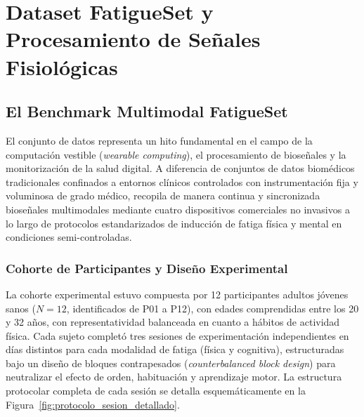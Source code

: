 
\chapter{Dataset FatigueSet y Procesamiento de Señales Fisiológicas}
\label{cap:dataset_preprocesamiento}

\section{El Benchmark Multimodal FatigueSet}
\label{sec:fatigueset_benchmark}

El conjunto de datos \fatigueset{} \cite{kalanadhabhatta2021fatigueset, kalanadhabhatta2022fatigueset} representa un hito fundamental en el campo de la computación vestible (\textit{wearable computing}), el procesamiento de bioseñales y la monitorización de la salud digital. A diferencia de conjuntos de datos biomédicos tradicionales confinados a entornos clínicos controlados con instrumentación fija y voluminosa de grado médico, \fatigueset{} recopila de manera continua y sincronizada bioseñales multimodales mediante cuatro dispositivos comerciales no invasivos a lo largo de protocolos estandarizados de inducción de fatiga física y mental en condiciones semi-controladas.

\subsection{Cohorte de Participantes y Diseño Experimental}

La cohorte experimental estuvo compuesta por 12 participantes adultos jóvenes sanos ($N=12$, identificados de P01 a P12), con edades comprendidas entre los 20 y 32 años, con representatividad balanceada en cuanto a hábitos de actividad física. Cada sujeto completó tres sesiones de experimentación independientes en días distintos para cada modalidad de fatiga (física y cognitiva), estructuradas bajo un diseño de bloques contrapesados (\textit{counterbalanced block design}) para neutralizar el efecto de orden, habituación y aprendizaje motor. La estructura protocolar completa de cada sesión se detalla esquemáticamente en la Figura~\ref{fig:protocolo_sesion_detallado}.

